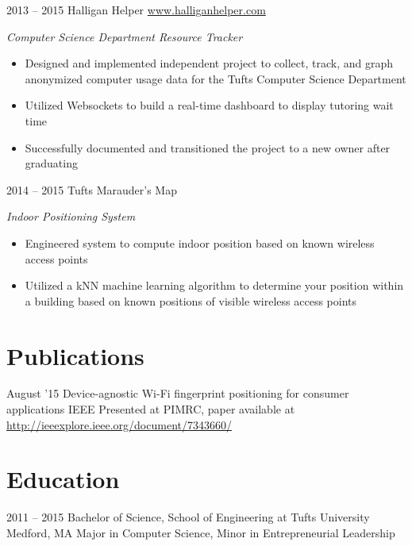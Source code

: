 \documentclass[print]{friggeri-cv} %
\begin{document}
\begin{entrylist}
\entry
{2013 -- 2015}
{Halligan Helper}
{\href{http://www.halliganhelper.com}{www.halliganhelper.com}}
{\emph{Computer Science Department Resource Tracker}
\begin{itemize}
\item Designed and implemented independent project to collect, track, and graph anonymized computer usage data for the Tufts Computer Science Department
\item Utilized Websockets to build a real-time dashboard to display tutoring wait time
\item Successfully documented and transitioned the project to a new owner after graduating
\end{itemize}}
\entry
{2014 -- 2015}
{Tufts Marauder's Map}
{}
{\emph{Indoor Positioning System}
\begin{itemize}
\item Engineered system to compute indoor position based on known wireless access points
\item Utilized a kNN machine learning algorithm to determine your position within a building based on known positions of visible wireless access points
\end{itemize}}
\end{entrylist}

\section{Publications}
\begin{entrylist}
\entry
{August '15}
{Device-agnostic Wi-Fi fingerprint positioning for consumer applications}
{IEEE}
{Presented at PIMRC, paper available at \href{http://ieeexplore.ieee.org/document/7343660/}{http://ieeexplore.ieee.org/document/7343660/}}
\end{entrylist}



\section{Education}
\begin{entrylist}
\entry
{2011 -- 2015}
{Bachelor of Science, School of Engineering at Tufts University}
{Medford, MA}
{Major in Computer Science, Minor in Entrepreneurial Leadership}


\end{entrylist}
\end{document}
